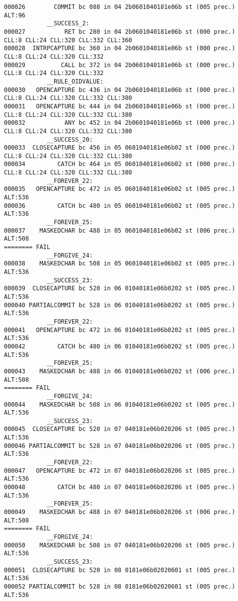 \begin{changemargin}{-60mm}{0mm}
\begin{myquote}
\begin{Verbatim}[fontsize=\scriptsize]
000026        COMMIT bc 088 in 04 2b0601040181e06b st (005 prec.) ALT:96 
            __SUCCESS_2:
000027           RET bc 280 in 04 2b0601040181e06b st (000 prec.) CLL:8 CLL:24 CLL:320 CLL:332 CLL:360 
000028  INTRPCAPTURE bc 360 in 04 2b0601040181e06b st (000 prec.) CLL:8 CLL:24 CLL:320 CLL:332 
000029          CALL bc 372 in 04 2b0601040181e06b st (000 prec.) CLL:8 CLL:24 CLL:320 CLL:332 
            __RULE_OIDVALUE:
000030   OPENCAPTURE bc 436 in 04 2b0601040181e06b st (000 prec.) CLL:8 CLL:24 CLL:320 CLL:332 CLL:380 
000031   OPENCAPTURE bc 444 in 04 2b0601040181e06b st (000 prec.) CLL:8 CLL:24 CLL:320 CLL:332 CLL:380 
000032           ANY bc 452 in 04 2b0601040181e06b st (000 prec.) CLL:8 CLL:24 CLL:320 CLL:332 CLL:380 
            __SUCCESS_20:
000033  CLOSECAPTURE bc 456 in 05 0601040181e06b02 st (000 prec.) CLL:8 CLL:24 CLL:320 CLL:332 CLL:380 
000034         CATCH bc 464 in 05 0601040181e06b02 st (000 prec.) CLL:8 CLL:24 CLL:320 CLL:332 CLL:380 
            __FOREVER_22:
000035   OPENCAPTURE bc 472 in 05 0601040181e06b02 st (005 prec.) ALT:536 
000036         CATCH bc 480 in 05 0601040181e06b02 st (005 prec.) ALT:536 
            __FOREVER_25:
000037    MASKEDCHAR bc 488 in 05 0601040181e06b02 st (006 prec.) ALT:508 
======== FAIL
            __FORGIVE_24:
000038    MASKEDCHAR bc 508 in 05 0601040181e06b02 st (005 prec.) ALT:536 
            __SUCCESS_23:
000039  CLOSECAPTURE bc 520 in 06 01040181e06b0202 st (005 prec.) ALT:536 
000040 PARTIALCOMMIT bc 528 in 06 01040181e06b0202 st (005 prec.) ALT:536 
            __FOREVER_22:
000041   OPENCAPTURE bc 472 in 06 01040181e06b0202 st (005 prec.) ALT:536 
000042         CATCH bc 480 in 06 01040181e06b0202 st (005 prec.) ALT:536 
            __FOREVER_25:
000043    MASKEDCHAR bc 488 in 06 01040181e06b0202 st (006 prec.) ALT:508 
======== FAIL
            __FORGIVE_24:
000044    MASKEDCHAR bc 508 in 06 01040181e06b0202 st (005 prec.) ALT:536 
            __SUCCESS_23:
000045  CLOSECAPTURE bc 520 in 07 040181e06b020206 st (005 prec.) ALT:536 
000046 PARTIALCOMMIT bc 528 in 07 040181e06b020206 st (005 prec.) ALT:536 
            __FOREVER_22:
000047   OPENCAPTURE bc 472 in 07 040181e06b020206 st (005 prec.) ALT:536 
000048         CATCH bc 480 in 07 040181e06b020206 st (005 prec.) ALT:536 
            __FOREVER_25:
000049    MASKEDCHAR bc 488 in 07 040181e06b020206 st (006 prec.) ALT:508 
======== FAIL
            __FORGIVE_24:
000050    MASKEDCHAR bc 508 in 07 040181e06b020206 st (005 prec.) ALT:536 
            __SUCCESS_23:
000051  CLOSECAPTURE bc 520 in 08 0181e06b02020601 st (005 prec.) ALT:536 
000052 PARTIALCOMMIT bc 528 in 08 0181e06b02020601 st (005 prec.) ALT:536 

\end{Verbatim}
\end{myquote}
\end{changemargin}
